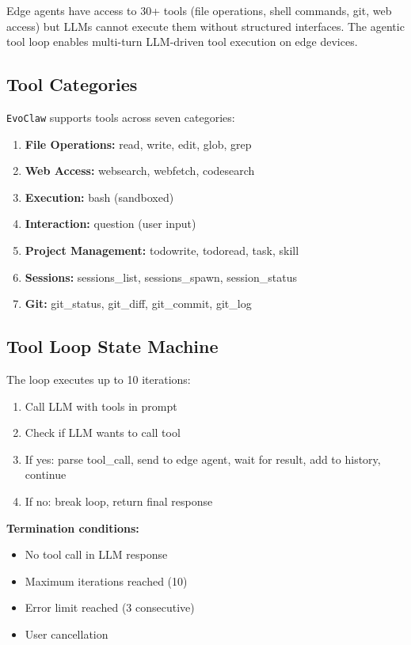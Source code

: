 \documentclass{article}
\newcommand{\evoclaw}{\texttt{EvoClaw}\xspace}
\begin{document}
Edge agents have access to 30+ tools (file operations, shell commands, git, web access) but LLMs cannot execute them without structured interfaces. The agentic tool loop enables multi-turn LLM-driven tool execution on edge devices.

\subsection{Tool Categories}

\evoclaw{} supports tools across seven categories:

\begin{enumerate}[leftmargin=*]
    \item \textbf{File Operations:} read, write, edit, glob, grep
    \item \textbf{Web Access:} websearch, webfetch, codesearch
    \item \textbf{Execution:} bash (sandboxed)
    \item \textbf{Interaction:} question (user input)
    \item \textbf{Project Management:} todowrite, todoread, task, skill
    \item \textbf{Sessions:} sessions\_list, sessions\_spawn, session\_status
    \item \textbf{Git:} git\_status, git\_diff, git\_commit, git\_log
\end{enumerate}

\subsection{Tool Loop State Machine}

The loop executes up to 10 iterations:

\begin{enumerate}[leftmargin=*]
    \item Call LLM with tools in prompt
    \item Check if LLM wants to call tool
    \item If yes: parse tool\_call, send to edge agent, wait for result, add to history, continue
    \item If no: break loop, return final response
\end{enumerate}

\textbf{Termination conditions:}
\begin{itemize}[leftmargin=*]
    \item No tool call in LLM response
    \item Maximum iterations reached (10)
    \item Error limit reached (3 consecutive)
    \item User cancellation
\end{itemize}
\end{document}
